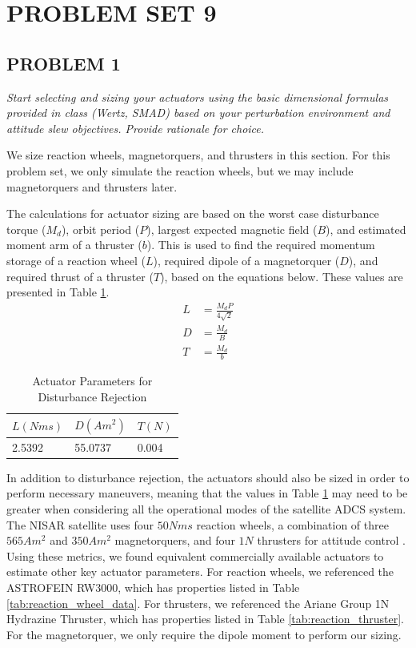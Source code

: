 \section{\Large PROBLEM SET 9}
\subsection{PROBLEM 1}
\textit{Start selecting and sizing your actuators using the basic dimensional formulas provided in class (Wertz, SMAD) based on your perturbation environment and attitude slew objectives. Provide rationale for choice.}

We size reaction wheels, magnetorquers, and thrusters in this section. For this problem set, we only simulate the reaction wheels, but we may include magnetorquers and thrusters later.

The calculations for actuator sizing are based on the worst case disturbance torque ($M_d$), orbit period ($P$), largest expected magnetic field ($B$), and estimated moment arm of a thruster ($b$). This is used to find the required momentum storage of a reaction wheel ($L$), required dipole of a magnetorquer ($D$), and required thrust of a thruster ($T$), based on the equations below. These values are presented in Table \ref{tab:estimate_actuator_sizing}.
\begin{align*}
    L &= \frac{M_d P}{4 \sqrt{2}} \\
    D &= \frac{M_d}{B} \\
    T &= \frac{M_d}{b}
\end{align*}
\vspace{-2em}
\begin{table}[H]
\centering
\caption{Actuator Parameters for Disturbance Rejection}
\label{tab:estimate_actuator_sizing}
\begin{tabular}{|l|l|l|}
\hline
$L (N m s)$ & $D (A m^2)$ & $T (N)$    \\ \hline
2.5392    & 55.0737   & 0.004        \\ \hline
\end{tabular}
\end{table}

In addition to disturbance rejection, the actuators should also be sized in order to perform necessary maneuvers, meaning that the values in Table \ref{tab:estimate_actuator_sizing} may need to be greater when considering all the operational modes of the satellite ADCS system. The NISAR satellite uses four $50 N m s$ reaction wheels, a combination of three $565 A m^2$ and $350 A m^2$ magnetorquers, and four $1 N$ thrusters for attitude control \cite{NISARMission}. Using these metrics, we found equivalent commercially available actuators to estimate other key actuator parameters. For reaction wheels, we referenced the ASTROFEIN RW3000, which has properties listed in Table \ref{tab:reaction_wheel_data}. For thrusters, we referenced the Ariane Group 1N Hydrazine Thruster, which has properties listed in Table \ref{tab:reaction_thruster}. For the magnetorquer, we only require the dipole moment to perform our sizing.

